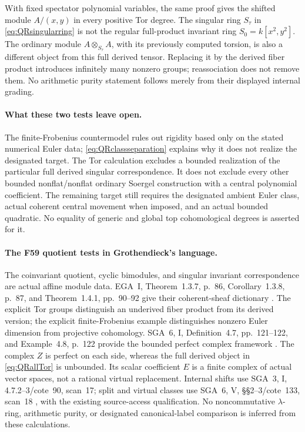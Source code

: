 With fixed spectator polynomial variables, the
same proof gives the shifted module \(A/(x,y)\)
in every positive Tor degree.
The singular ring \(S_\tau\) in
\eqref{eq:QRsingularring} is not the regular
full-product invariant ring \(S_0=k[x^2,y^2]\).
The ordinary module \(A\otimes_{S_\tau}A\), with
its previously computed torsion, is also a
different object from this full derived tensor.
Replacing it by the derived fiber product
introduces infinitely many nonzero groups;
reassociation does not remove them.
No arithmetic purity statement follows merely
from their displayed internal grading.

\paragraph{What these two tests leave open.}
The finite-Frobenius countermodel rules out
rigidity based only on the stated numerical
Euler data; \eqref{eq:QRclassseparation} explains
why it does not realize the designated target.
The Tor calculation excludes a bounded realization
of the particular full derived singular
correspondence. It does not exclude every other
bounded nonflat/nonflat ordinary Soergel
construction with a central polynomial coefficient.
The remaining target still requires the designated
ambient Euler class, actual coherent central
movement when imposed, and an actual bounded
quadratic. No equality of generic and global
top cohomological degrees is asserted for it.

\paragraph{The F59 quotient tests in Grothendieck's language.}
The coinvariant quotient, cyclic bimodules, and
singular invariant correspondence are actual
affine module data. EGA~I, Theorem~1.3.7, p.~86,
Corollary~1.3.8, p.~87, and Theorem~1.4.1,
pp.~90--92 give their coherent-sheaf dictionary
\cite{EGA}. The explicit Tor groups distinguish
an underived fiber product from its derived
version; the explicit finite-Frobenius example
distinguishes nonzero Euler dimension from
projective cohomology.
SGA~6, I, Definition~4.7, pp.~121--122, and
Example~4.8, p.~122 provide the bounded perfect
complex framework \cite{SGA6}. The complex \(Z\)
is perfect on each side, whereas the full derived
object in \eqref{eq:QRallTor} is unbounded.
Its scalar coefficient \(E\) is a finite complex
of actual vector spaces, not a rational virtual
replacement. Internal shifts use SGA~3, I,
4.7.2--3/cote~90, scan~17; split and virtual
classes use SGA~6, V, \S\S2--3/cote~133, scan~18
\cite{SGA3,SGA6,Archive}, with the existing
source-access qualification.
No noncommutative \(\lambda\)-ring, arithmetic
purity, or designated canonical-label comparison
is inferred from these calculations.
